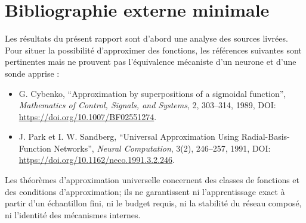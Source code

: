 \documentclass[11pt,a4paper,oneside]{report}
\begin{document}
\chapter{Bibliographie externe minimale}
Les résultats du présent rapport sont d'abord une analyse des sources livrées. Pour situer la possibilité d'approximer des fonctions, les références suivantes sont pertinentes mais ne prouvent pas l'équivalence mécaniste d'un neurone et d'une sonde apprise :
\begin{itemize}
\item G. Cybenko, ``Approximation by superpositions of a sigmoidal function'', \emph{Mathematics of Control, Signals, and Systems}, 2, 303--314, 1989, DOI: \url{https://doi.org/10.1007/BF02551274}.
\item J. Park et I. W. Sandberg, ``Universal Approximation Using Radial-Basis-Function Networks'', \emph{Neural Computation}, 3(2), 246--257, 1991, DOI: \url{https://doi.org/10.1162/neco.1991.3.2.246}.
\end{itemize}
Les théorèmes d'approximation universelle concernent des classes de fonctions et des conditions d'approximation; ils ne garantissent ni l'apprentissage exact à partir d'un échantillon fini, ni le budget requis, ni la stabilité du réseau composé, ni l'identité des mécanismes internes.
\end{document}
